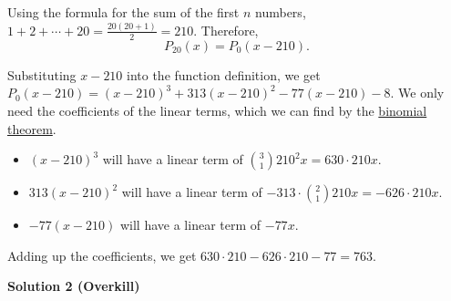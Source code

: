 \begin{enumerate}
 
Using the formula for the sum of the first $n$ numbers, $1 + 2 + \cdots + 20 = \frac{20(20+1)}{2} = 210$. Therefore, 
 \[P_{20}(x) = P_0(x - 210).\]

 Substituting $x - 210$ into the function definition, we get $P_0(x-210) = (x - 210)^3 + 313(x - 210)^2 - 77(x - 210) - 8$. We only need the coefficients of the linear terms, which we can find by the \href{https://artofproblemsolving.com/wiki/index.php?title=Binomial\_theorem}{binomial theorem}. 

 
            \begin{itemize}
        \item $(x-210)^3$ will have a linear term of ${3\choose1}210^2x = 630 \cdot 210x$.
        \item $313(x-210)^2$ will have a linear term of $-313 \cdot {2\choose1}210x = -626 \cdot 210x$.
        \item $-77(x-210)$ will have a linear term of $-77x$.
            \end{itemize}
            Adding up the coefficients, we get $630 \cdot 210 - 626 \cdot 210 - 77 = \boxed{763}$.

 



\textbf{Solution 2 (Overkill)}


\end{enumerate}
